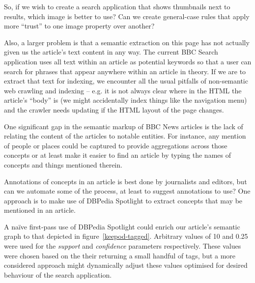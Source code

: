 So, if we wish to create a search application that shows thumbnails next
to results, which image is better to use? Can we create general-case
rules that apply more ``trust'' to one image property over another?

Also, a larger problem is that a semantic extraction on this page
has not actually given us the article's text content in any way. The
current BBC Search application uses all text within an article as
potential keywords so that a user can search for phrases that appear
anywhere within an article in theory. If we are to extract that text
for indexing, we encounter all the usual pitfalls of non-semantic
web crawling and indexing -- e.g. it is not always clear where
in the HTML the article's ``body'' is (we might accidentally index
things like the navigation menu) and the crawler needs updating
if the HTML layout of the page changes.

One significant gap in the semantic markup of BBC News articles is
the lack of relating the content of the articles to notable entities.
For instance, any mention of people or places could be captured
to provide aggregations across those concepts or at least make it
easier to find an article by typing the names of concepts and things
mentioned therein.

Annotations of concepts in an article is best done by journalists
and editors, but can we automate some of the process, at least
to suggest annotations to use? One approach is to make use of
DBPedia Spotlight to extract concepts that may be mentioned in
an article.

\begin{sidewaysfigure}
  \begin{center}
    \begin{dot2tex}[dot,pgf,scale=0.41]
      
    \end{dot2tex}
  \end{center}
  \caption{BBC News article page's metadata enriched using DBPedia Spotlight}
  \label{keepod-tagged}
\end{sidewaysfigure}

A na\"ive first-pass use of DBPedia Spotlight could enrich
our article's semantic graph to that depicted in figure~\ref{keepod-tagged}.
Arbitrary values of 10 and 0.25 were used for the \emph{support}
and \emph{confidence} parameters respectively. These values were
chosen based on the their returning a small handful of tags, but
a more considered approach might dynamically adjust these values
optimised for desired behaviour of the search application.

